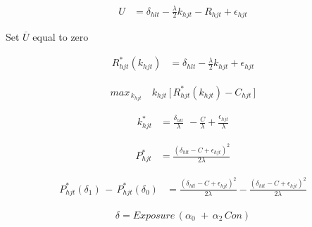 \documentclass[12pt]{article}
\begin{document}




\begin{align*}
U &= \delta_{hlt} - \frac{\lambda}{2} k_{hjt} - R_{hjt}   + \epsilon_{hjt}  
\end{align*}

Set $\overline{U}$ equal to zero 

\begin{align*}
\label{eq:rent}
R_{hjt}^{*}(k_{hjt}) &= \delta_{hlt} - \frac{\lambda}{2} k_{hjt} + \epsilon_{hjt}
\end{align*}


\begin{align*}
max_{\,k_{hjt}} \,\,\,\,\,\,  k_{hjt} \, \Big[ \, R_{hjt}^{*}(k_{hjt}) - C_{hjt} \, \Big ]
\end{align*}


\begin{align*}
k_{hjt}^{*} &= \frac{\delta_{hlt}}{\lambda} \,\, - \frac{C}{\lambda} + \frac{\epsilon_{hjt}}{\lambda}
\end{align*}

\begin{align*}
P_{hjt}^{*}  &= \frac{(\delta_{hlt}-C + \epsilon_{hjt} )^2}{2\lambda}
\end{align*}




\begin{align*}
P_{hjt}^{*}(\delta_{1}) \, - \, P_{hjt}^{*}(\delta_{0})  &= \frac{(\delta_{hlt}-C + \epsilon_{hjt} )^2}{2\lambda} - \frac{(\delta_{hlt}-C + \epsilon_{hjt} )^2}{2\lambda}
\end{align*}


\begin{align*}
\delta = Exposure \, (\alpha_0 \,  \,  +  \, \alpha_2 \, Con )
\end{align*}
\end{document}
